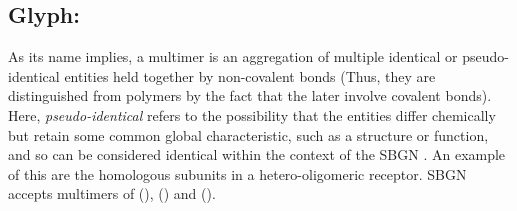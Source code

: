
\subsection{Glyph: }
\label{sec:multimer}

As its name implies, a multimer is an aggregation of multiple identical or pseudo-identical entities held together by non-covalent bonds (Thus, they are distinguished from polymers by the fact that the later involve covalent bonds). Here,  \emph{pseudo-identical} refers to the possibility that the entities differ chemically but retain some common global characteristic, such as a structure or function, and so can be considered identical within the context of the SBGN \PD.  An example of this are the homologous subunits in a hetero-oligomeric receptor. SBGN \PD accepts multimers of  (),  () and  ().

